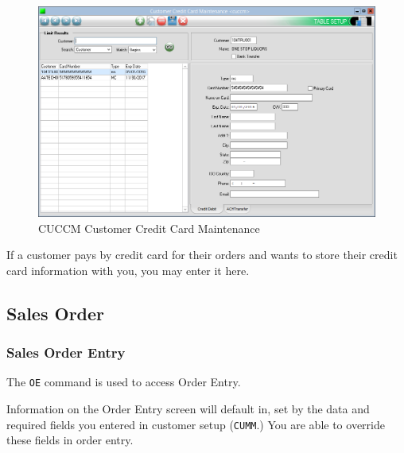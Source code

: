 \begin{figure}[H]
	\includegraphics[width=\textwidth]{../img/image91}
	\caption{CUCCM Customer Credit Card Maintenance}
\end{figure}

If a customer pays by credit card for their orders and wants to store their credit card information with you, you may enter it here.

\subsection{Sales Order}

\subsubsection{Sales Order Entry}


The \texttt{OE} command is used to access Order Entry.

Information on the Order Entry screen will default in, set by the data and required fields you entered in customer setup (\texttt{CUMM}.) You are able to override these fields in order entry.

